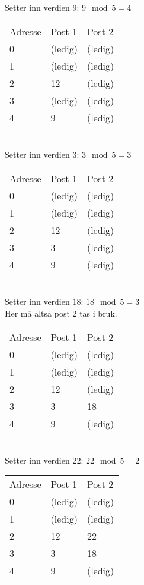 \documentclass[a4paper, 12pt] {article}
\begin{document}
~\\
Setter inn verdien $9$: $9 \mod 5 = 4$\\
\begin{tabular}{|l|l|l|}
    \hline
    Adresse & Post 1 & Post 2 \\
    0       & (ledig)& (ledig)\\
    1       & (ledig)& (ledig)\\
    2       & 12     & (ledig)\\
    3       & (ledig)& (ledig)\\
    4       & 9      & (ledig)\\ \hline
\end{tabular}

~\\
Setter inn verdien $3$: $3 \mod 5 = 3$\\
\begin{tabular}{|l|l|l|}
    \hline
    Adresse & Post 1 & Post 2 \\
    0       & (ledig)& (ledig)\\
    1       & (ledig)& (ledig)\\
    2       & 12     & (ledig)\\
    3       & 3      & (ledig)\\
    4       & 9      & (ledig)\\ \hline
\end{tabular}

~\\
Setter inn verdien $18$: $18 \mod 5 = 3$\\
Her må altså post 2 tas i bruk.\\
\begin{tabular}{|l|l|l|}
    \hline
    Adresse & Post 1 & Post 2 \\
    0       & (ledig)& (ledig)\\
    1       & (ledig)& (ledig)\\
    2       & 12     & (ledig)\\
    3       & 3      & 18      \\
    4       & 9      & (ledig)\\ \hline
\end{tabular}

~\\
Setter inn verdien $22$: $22 \mod 5 = 2$\\
\begin{tabular}{|l|l|l|}
    \hline
    Adresse & Post 1 & Post 2 \\
    0       & (ledig)& (ledig)\\
    1       & (ledig)& (ledig)\\
    2       & 12     & 22     \\
    3       & 3      & 18     \\
    4       & 9      & (ledig)\\ \hline
\end{tabular}
\end{document}

